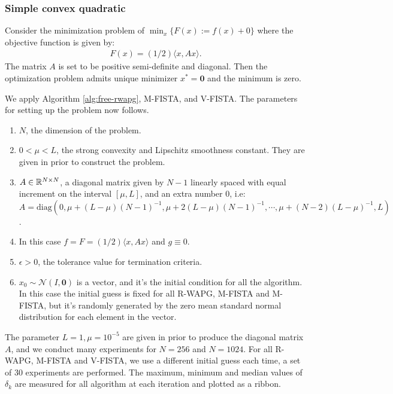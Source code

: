 \documentclass[12pt]{article}
\begin{document}
        \subsubsection{Simple convex quadratic}
            Consider the minimization problem of $\min_x \{F(x):= f(x) + 0\}$ where the objective function is given by: 
            \begin{align*}
                F(x) = (1/2)\langle x, A x\rangle. 
            \end{align*}
            The matrix $A$ is set to be positive semi-definite and diagonal. 
            Then the optimization problem admits unique minimizer $x^* = \mathbf 0$ and the minimum is zero. 
            \par
            We apply Algorithm \ref{alg:free-rwapg}, M-FISTA, and V-FISTA. 
            The parameters for setting up the problem now follows. 
            \begin{enumerate}
                \item $N$, the dimension of the problem. 
                \item $0 < \mu < L$, the strong convexity and Lipschitz smoothness constant. They are given in prior to construct the problem. 
                \item $A \in \mathbb R^{N\times N}$, a diagonal matrix given by $N- 1$ linearly spaced with equal increment on the interval $[\mu, L]$, and an extra number $0$, i.e: $A = \text{diag}(0, \mu + (L-\mu)(N - 1)^{-1}, \mu + 2(L-\mu)(N - 1)^{-1}, \cdots, \mu + (N - 2)(L - \mu)^{-1}, L)$. 
                \item In this case $f = F = (1/2)\langle x, A x\rangle$ and $g \equiv 0$. 
                \item $\epsilon > 0$, the tolerance value for termination criteria. 
                \item $x_0 \sim \mathcal N(I, \mathbf 0)$ is a vector, and it's the initial condition for all the algorithm. In this case the initial guess is fixed for all R-WAPG, M-FISTA and M-FISTA, but it's randomly generated by the zero mean standard normal distribution for each element in the vector. 
            \end{enumerate}
            The parameter $L=1, \mu=10^{-5}$ are given in prior to produce the diagonal matrix $A$, and we conduct many experiments for $N = 256$ and $N = 1024$. 
            For all R-WAPG, M-FISTA and V-FISTA, 
            we use a different initial guess each time, a set of 30 experiments are performed. 
            The maximum, minimum and median values of $\delta_k$ are measured for all algorithm at each iteration and plotted as a ribbon. 
\end{document}
